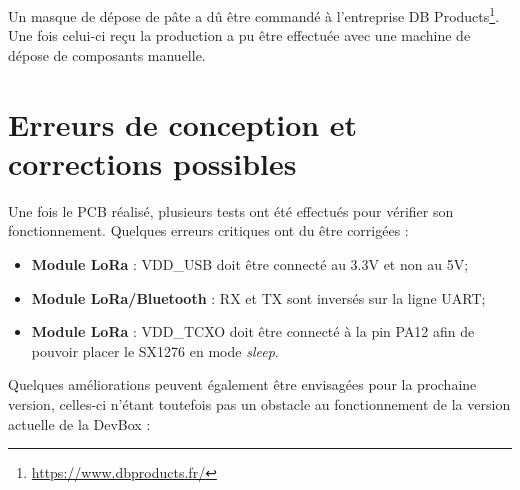 Un masque de dépose de pâte a dû être commandé à l'entreprise DB Products\footnote{\url{https://www.dbproducts.fr/}}. Une fois celui-ci reçu la production a pu être effectuée avec une machine de dépose de composants manuelle.

\section{Erreurs de conception et corrections possibles}
\label{sec_hardware_errors}

Une fois le PCB réalisé, plusieurs tests ont été effectués pour vérifier son fonctionnement. Quelques erreurs critiques ont du être corrigées : 

\begin{itemize}
    \item \textbf{Module LoRa} : VDD\_USB doit être connecté au 3.3V et non au 5V;
    \item \textbf{Module LoRa/Bluetooth} : RX et TX sont inversés sur la ligne UART;
    \item \textbf{Module LoRa} : VDD\_TCXO doit être connecté à la pin PA12 afin de pouvoir placer le SX1276 en mode \textit{sleep}.\\
\end{itemize}

Quelques améliorations peuvent également être envisagées pour la prochaine version, celles-ci n'étant toutefois pas un obstacle au fonctionnement de la version actuelle de la DevBox : 

